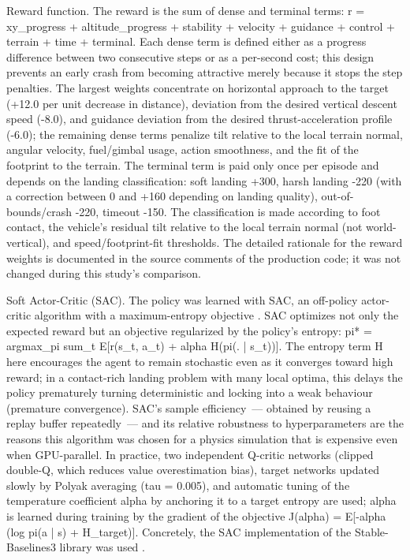 Reward function. The reward is the sum of dense and terminal terms: r = xy\_progress + altitude\_progress + stability + velocity + guidance + control + terrain + time + terminal. Each dense term is defined either as a progress difference between two consecutive steps or as a per-second cost; this design prevents an early crash from becoming attractive merely because it stops the step penalties. The largest weights concentrate on horizontal approach to the target (+12.0 per unit decrease in distance), deviation from the desired vertical descent speed (-8.0), and guidance deviation from the desired thrust-acceleration profile (-6.0); the remaining dense terms penalize tilt relative to the local terrain normal, angular velocity, fuel/gimbal usage, action smoothness, and the fit of the footprint to the terrain. The terminal term is paid only once per episode and depends on the landing classification: soft landing +300, harsh landing -220 (with a correction between 0 and +160 depending on landing quality), out-of-bounds/crash -220, timeout -150. The classification is made according to foot contact, the vehicle's residual tilt relative to the local terrain normal (not world-vertical), and speed/footprint-fit thresholds. The detailed rationale for the reward weights is documented in the source comments of the production code; it was not changed during this study's comparison.

Soft Actor-Critic (SAC). The policy was learned with SAC, an off-policy actor-critic algorithm with a maximum-entropy objective \citep{haarnoja2018}. SAC optimizes not only the expected reward but an objective regularized by the policy's entropy: pi* = argmax\_pi sum\_t E[r(s\_t, a\_t) + alpha H(pi(. | s\_t))]. The entropy term H here encourages the agent to remain stochastic even as it converges toward high reward; in a contact-rich landing problem with many local optima, this delays the policy prematurely turning deterministic and locking into a weak behaviour (premature convergence). SAC's sample efficiency~--- obtained by reusing a replay buffer repeatedly~--- and its relative robustness to hyperparameters are the reasons this algorithm was chosen for a physics simulation that is expensive even when GPU-parallel. In practice, two independent Q-critic networks (clipped double-Q, which reduces value overestimation bias), target networks updated slowly by Polyak averaging (tau = 0.005), and automatic tuning of the temperature coefficient alpha by anchoring it to a target entropy are used; alpha is learned during training by the gradient of the objective J(alpha) = E[-alpha (log pi(a | s) + H\_target)]. Concretely, the SAC implementation of the Stable-Baselines3 library was used \citep{raffin2021}.

